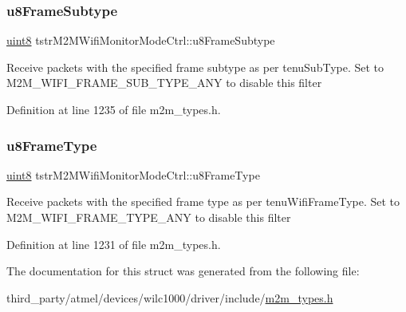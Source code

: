 \subsubsection{\texorpdfstring{u8\+Frame\+Subtype}{u8FrameSubtype}}
{\footnotesize\ttfamily \hyperlink{group__DataT_ga4df709a77647e870bbf1d955b8edc9a6}{uint8} tstr\+M2\+M\+Wifi\+Monitor\+Mode\+Ctrl\+::u8\+Frame\+Subtype}

Receive packets with the specified frame subtype as per tenu\+Sub\+Type. Set to M2\+M\+\_\+\+W\+I\+F\+I\+\_\+\+F\+R\+A\+M\+E\+\_\+\+S\+U\+B\+\_\+\+T\+Y\+P\+E\+\_\+\+A\+NY to disable this filter 

Definition at line 1235 of file m2m\+\_\+types.\+h.

\mbox{\label{structtstrM2MWifiMonitorModeCtrl_a1302bd34bc71c93586443e1bfa0e5b20}} 
\subsubsection{\texorpdfstring{u8\+Frame\+Type}{u8FrameType}}
{\footnotesize\ttfamily \hyperlink{group__DataT_ga4df709a77647e870bbf1d955b8edc9a6}{uint8} tstr\+M2\+M\+Wifi\+Monitor\+Mode\+Ctrl\+::u8\+Frame\+Type}

Receive packets with the specified frame type as per tenu\+Wifi\+Frame\+Type. Set to M2\+M\+\_\+\+W\+I\+F\+I\+\_\+\+F\+R\+A\+M\+E\+\_\+\+T\+Y\+P\+E\+\_\+\+A\+NY to disable this filter 

Definition at line 1231 of file m2m\+\_\+types.\+h.



The documentation for this struct was generated from the following file\+:\begin{DoxyCompactItemize}
\item 
third\+\_\+party/atmel/devices/wilc1000/driver/include/\hyperlink{m2m__types_8h}{m2m\+\_\+types.\+h}\end{DoxyCompactItemize}
